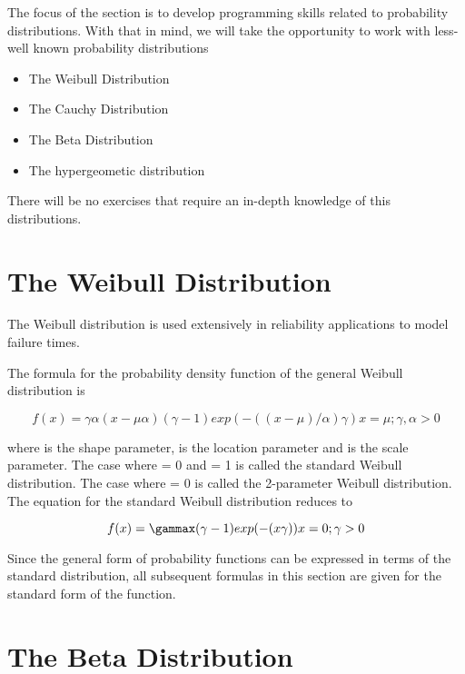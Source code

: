 


The focus of the section is to develop programming skills
related to probability distributions. With that in mind, we will take the opportunity
to work with less-well known probability distributions

\begin{itemize}
\item The Weibull Distribution
\item The Cauchy Distribution
\item The Beta Distribution
\item The hypergeometic distribution
\end{itemize}

There will be no exercises that require an in-depth knowledge of this distributions.


\section{The Weibull Distribution}
The Weibull distribution is used extensively in reliability applications to model failure times.



The formula for the probability density function of the general Weibull distribution is

\[ f(x)=\gamma\alpha(x-\mu\alpha)(\gamma-1)exp(-((x-\mu)/\alpha)\gamma)x=\mu;\gamma,\alpha>0\]

where \gamma is the shape parameter, \mu is the location parameter and \alpha is the scale parameter. The case where \mu = 0 and \alpha = 1 is called the standard Weibull distribution. The case where \mu = 0 is called the 2-parameter Weibull distribution. The equation for the standard Weibull distribution reduces to

\[ f(x)=\gammax(\gamma-1)exp(-(x\gamma))x=0;\gamma>0 \]

Since the general form of probability functions can be expressed in terms of the standard distribution, all subsequent formulas in this section are given for the standard form of the function.


\section{The Beta Distribution}

